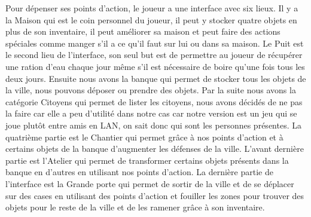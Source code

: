 \documentclass[a4paper,11pt]{article}
\begin{document}
Pour dépenser ses points d’action, le joueur a une interface avec six lieux. Il y a la Maison qui est le coin personnel du joueur, il peut y stocker quatre objets en plus de son inventaire, il peut améliorer sa maison et peut faire des actions spéciales comme manger s’il a ce qu’il faut sur lui ou dans sa maison. Le Puit est le second lieu de l’interface, son seul but est de permettre au joueur de récupérer une ration d’eau chaque jour même s’il est nécessaire de boire qu’une fois tous les deux jours. Ensuite nous avons la banque qui permet de stocker tous les objets de la ville, nous pouvons déposer ou prendre des objets. Par la suite nous avons la catégorie Citoyens qui permet de lister les citoyens, nous avons décidés de ne pas la faire car elle a peu d’utilité dans notre cas car notre version est un jeu qui se joue plutôt entre amis en LAN, on sait donc qui sont les personnes présentes. La quatrième partie est le Chantier qui permet grâce à nos points d’action et à certains objets de la banque d’augmenter les défenses de la ville. L’avant dernière partie est l’Atelier qui permet de transformer certains objets présents dans la banque en d’autres en utilisant nos points d’action. La dernière partie de l’interface est la Grande porte qui permet de sortir de la ville et de se déplacer sur des cases en utilisant des points d’action et fouiller les zones pour trouver des objets pour le reste de la ville et de les ramener grâce à son inventaire. 


\newpage
\end{document}
